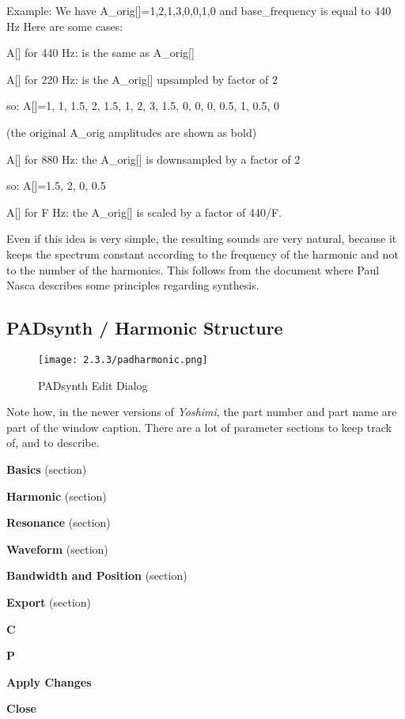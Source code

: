    Example:
   We have A\_orig[]={1,2,1,3,0,0,1,0} and base\_frequency is equal to 440 Hz
   Here are some cases:

   A[] for 440 Hz: is the same as A\_orig[]

   A[] for 220 Hz: is the A\_orig[] upsampled by factor of 2

   so: A[]={1, 1, 1.5, 2, 1.5, 1, 2, 3, 1.5, 0, 0, 0, 0.5, 1, 0.5, 0}

   (the original A\_orig amplitudes are shown as bold)

   A[] for 880 Hz: the A\_orig[] is downsampled by a factor of 2

   so: A[]={1.5, 2, 0, 0.5}

   A[] for F Hz: the A\_orig[] is scaled by a factor of 440/F.

   Even if this idea is very simple, the resulting sounds are very natural,
   because it keeps the spectrum constant according to the frequency of the
   harmonic and not to the number of the harmonics. This follows from the
   document where Paul Nasca describes some principles regarding synthesis.

\subsection{PADsynth / Harmonic Structure}
\label{subsec:padsynth_harmonic_structure}

\begin{figure}[H]
   \centering
   \texttt{[image: 2.3.3/padharmonic.png]}
   \caption{PADsynth Edit Dialog}
   \label{fig:padsynth_edit_dialog}
\end{figure}

   Note how, in the newer versions of \textsl{Yoshimi}, the
   part number and part name are part of the window caption.
   There are a lot of parameter sections to keep track of, and to describe.

   \begin{enumber}
      \item \textbf{Basics} (section)
      \item \textbf{Harmonic} (section)
      \item \textbf{Resonance} (section)
      \item \textbf{Waveform} (section)
      \item \textbf{Bandwidth and Position} (section)
      \item \textbf{Export} (section)
      \item \textbf{C}
      \item \textbf{P}
      \item \textbf{Apply Changes}
      \item \textbf{Close}
   \end{enumber}

